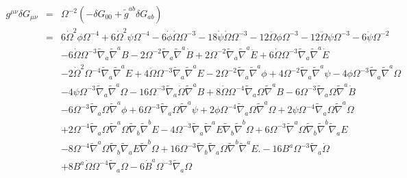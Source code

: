 \documentclass[10pt,letterpaper]{article}
\numberwithin{equation}{section}
\begin{document}
\begin{eqnarray}
g^{\mu\nu}\delta G_{\mu\nu} &=& \Omega^{-2}( -\delta G_{00} + \tilde g^{ab}\delta G_{ab})
\nonumber\\
&=&6 \dot{\Omega}^2 \phi \Omega^{-4}
+ 6 \dot{\Omega}^2 \psi \Omega^{-4}
- 6 \dot{\phi} \dot{\Omega} \Omega^{-3}
- 18 \dot{\psi} \dot{\Omega} \Omega^{-3}
- 12 \ddot{\Omega} \phi \Omega^{-3}
- 12 \ddot{\Omega} \psi \Omega^{-3}
- 6 \ddot{\psi} \Omega^{-2}\nonumber\\
&& - 6 \dot{\Omega} \Omega^{-3} \tilde{\nabla}_{a}\tilde{\nabla}^{a}B
- 2 \Omega^{-2} \tilde{\nabla}_{a}\tilde{\nabla}^{a}\dot{B}
+ 2 \Omega^{-2} \tilde{\nabla}_{a}\tilde{\nabla}^{a}\ddot{E}
+ 6 \dot{\Omega} \Omega^{-3} \tilde{\nabla}_{a}\tilde{\nabla}^{a}\dot{E}\nonumber\\
&& - 2 \dot{\Omega}^2 \Omega^{-4} \tilde{\nabla}_{a}\tilde{\nabla}^{a}E
+ 4 \ddot{\Omega} \Omega^{-3} \tilde{\nabla}_{a}\tilde{\nabla}^{a}E
- 2 \Omega^{-2} \tilde{\nabla}_{a}\tilde{\nabla}^{a}\phi
+ 4 \Omega^{-2} \tilde{\nabla}_{a}\tilde{\nabla}^{a}\psi
- 4 \phi \Omega^{-3} \tilde{\nabla}_{a}\tilde{\nabla}^{a}\Omega\nonumber\\
&& - 4 \psi \Omega^{-3} \tilde{\nabla}_{a}\tilde{\nabla}^{a}\Omega
- 16 \Omega^{-3} \tilde{\nabla}_{a}\dot{\Omega} \tilde{\nabla}^{a}B
+ 8 \dot{\Omega} \Omega^{-4} \tilde{\nabla}_{a}\Omega \tilde{\nabla}^{a}B
- 6 \Omega^{-3} \tilde{\nabla}_{a}\Omega \tilde{\nabla}^{a}\dot{B}\nonumber\\
&& - 6 \Omega^{-3} \tilde{\nabla}_{a}\Omega \tilde{\nabla}^{a}\phi
+ 6 \Omega^{-3} \tilde{\nabla}_{a}\Omega \tilde{\nabla}^{a}\psi
+ 2 \phi \Omega^{-4} \tilde{\nabla}_{a}\Omega \tilde{\nabla}^{a}\Omega
+ 2 \psi \Omega^{-4} \tilde{\nabla}_{a}\Omega \tilde{\nabla}^{a}\Omega\nonumber\\
&& + 2 \Omega^{-4} \tilde{\nabla}_{a}\Omega \tilde{\nabla}^{a}\Omega \tilde{\nabla}_{b}\tilde{\nabla}^{b}E
- 4 \Omega^{-3} \tilde{\nabla}_{a}\tilde{\nabla}^{a}E \tilde{\nabla}_{b}\tilde{\nabla}^{b}\Omega
+ 6 \Omega^{-3} \tilde{\nabla}^{a}\Omega \tilde{\nabla}_{b}\tilde{\nabla}^{b}\tilde{\nabla}_{a}E\nonumber\\
&& - 8 \Omega^{-4} \tilde{\nabla}^{a}\Omega \tilde{\nabla}_{b}\tilde{\nabla}_{a}E \tilde{\nabla}^{b}\Omega
+ 16 \Omega^{-3} \tilde{\nabla}_{b}\tilde{\nabla}_{a}\Omega \tilde{\nabla}^{b}\tilde{\nabla}^{a}E.
-16 B^{a} \Omega^{-3} \tilde{\nabla}_{a}\dot{\Omega}
\nonumber\\
&&+ 8 B^{a} \dot{\Omega} \Omega^{-4} \tilde{\nabla}_{a}\Omega
- 6 \dot{B}^{a} \Omega^{-3} \tilde{\nabla}_{a}\Omega

\end{eqnarray}
\end{document}
